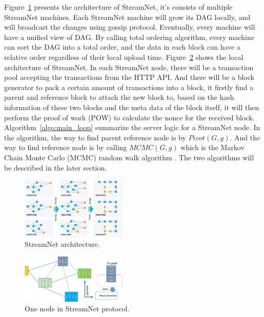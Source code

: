 Figure~\ref{architecture} presents the architecture of StreamNet,
it's consists of multiple StreamNet machines.
Each StreamNet machine will grow its DAG locally, and will broadcast the changes using gossip protocol. 
Eventually, every machine will have a unified view of DAG.
By calling total ordering algorithm, every machine can sort the DAG into a total order, 
and the data in each block can have a relative order regardless of their local upload time.
Figure~\ref{node} shows the local architecture of StreamNet.
In each StreamNet node, there will be a transaction pool accepting the transactions from the HTTP API.
And there will be a block generator to pack a certain amount of transactions into a block, it firstly find a 
parent and reference block to attach the new block to, based on the hash information of these two blocks and the meta data of the block itself, 
it will then perform the proof of work (POW) to calculate the nonce for the received block.
Algorithm~\ref{algo:main_loop} summarize the server logic for a StreamNet node.
In the algorithm, the way to find parent reference node is by $Pivot(G, g)$.
And the way to find reference node is by calling $MCMC(G, g)$ which is the Markov Chain Monte Carlo (MCMC) random walk algorithm \cite{popov2016tangle}.
The two algorithms will be described in the later section.

\begin{figure}[!ht]
\begin{center}
\includegraphics[width=0.45\textwidth]{figures/architecture.pdf}
    \caption{
        StreamNet architecture.
     }
\label{architecture}
\end{center}
\end{figure}

\begin{figure}[!ht]
\begin{center}
\includegraphics[width=0.45\textwidth]{figures/node.pdf}
    \caption{
        One node in StreamNet protocol.
     }
\label{node}
\end{center}
\end{figure}

